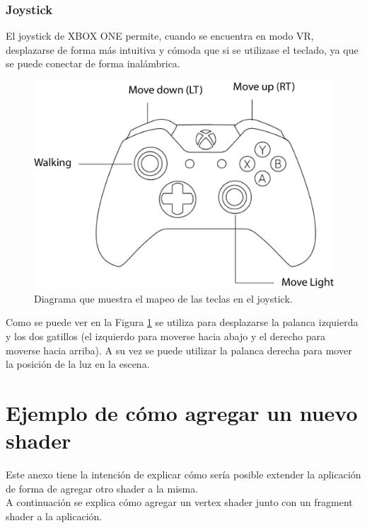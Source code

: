 \documentclass[12pt]{article}
\begin{document}
\subsubsection{Joystick}
El joystick de XBOX ONE permite, cuando se encuentra en modo VR, desplazarse de forma más intuitiva y cómoda que si se utilizase el teclado, ya que se puede conectar de forma inalámbrica.\\
\clearpage
\begin{figure}[h]
\includegraphics[width=0.8\linewidth]{joystick.png}
\caption{Diagrama que muestra el mapeo de las teclas en el joystick.}
\label{xbox1}
\end{figure}
Como se puede ver en la Figura \ref{xbox1} se utiliza para desplazarse la palanca izquierda y los dos gatillos (el izquierdo para moverse hacia abajo y el derecho para moverse hacia arriba). A su vez se puede utilizar la palanca derecha para mover la posición de la luz en la escena.
\clearpage
\section{Ejemplo de cómo agregar un nuevo shader}
Este anexo tiene la intención de explicar cómo sería posible extender la aplicación de forma de agregar otro shader a la misma.
\\A continuación se explica cómo agregar un vertex shader junto con un fragment shader a la aplicación.
\end{document}
